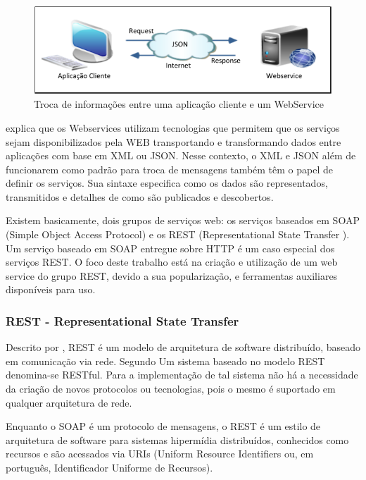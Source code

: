 \documentclass[12pt]{article}
\begin{document}
\begin{figure}[ht]
	\centering
	\includegraphics[width=.8\textwidth]{figura1.png}
	\caption{Troca de informações entre uma aplicação cliente e um WebService}
	\label{fig:exampleFigura1}
\end{figure}

\cite{souza04} explica que os Webservices utilizam tecnologias que permitem que
os serviços sejam disponibilizados pela WEB transportando e transformando dados
entre aplicações com base em XML ou JSON. Nesse contexto, o XML e JSON além de
funcionarem como padrão para troca de mensagens também têm o papel de definir os
serviços. Sua sintaxe especifica como os dados são representados, transmitidos e
detalhes de como são publicados e descobertos.

Existem basicamente, dois grupos de serviços web: os serviços baseados em SOAP (Simple Object Access Protocol) e os REST (Representational
State Transfer ). Um serviço baseado em SOAP entregue sobre HTTP é um caso especial dos serviços REST. O foco deste trabalho está na criação e utilização de um web service do grupo REST, devido a sua popularização, e ferramentas auxiliares disponíveis para uso.

\subsubsection{REST - Representational State Transfer}

Descrito por \cite{rest}, REST é um modelo de arquitetura de software distribuído, baseado em comunicação via rede.
Segundo \cite{richard:07} Um sistema baseado no modelo REST denomina-se RESTful. Para a implementação de tal sistema não há a necessidade da criação de novos protocolos ou tecnologias, pois o mesmo é suportado em qualquer arquitetura de rede.

Enquanto o SOAP é um protocolo de mensagens, o REST é um estilo de arquitetura
de software para sistemas hipermídia distribuídos, conhecidos como recursos e são acessados via URIs (Uniform Resource Identifiers ou, em português, Identificador Uniforme de Recursos). 
\end{document}
